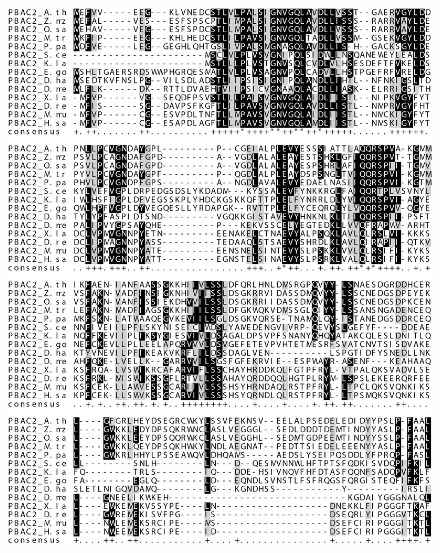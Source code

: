 \clearpage
\begin{figure}[ht]
	\centering
	\includegraphics[width=\columnwidth]{Proteasome/pbac2align1.png}
	{}
	\label{fig:pbac2align}
\end{figure}

